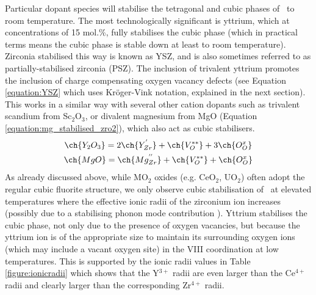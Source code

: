 Particular dopant species will stabilise the tetragonal and cubic phases of \zirconia\ to room temperature. The most technologically significant is yttrium, which at concentrations of 15 mol.\%, fully stabilises the cubic phase (which in practical terms means the cubic phase is stable down at least to room temperature). Zirconia stabilised this way is known as YSZ, and is also sometimes referred to as partially-stabilised zirconia (PSZ). The inclusion of trivalent yttrium promotes the inclusion of charge compensating oxygen vacancy defects (see Equation \ref{equation:YSZ} which uses Kr\"{o}ger-Vink notation, explained in the next section). This works in a similar way with several other cation dopants such as trivalent scandium from Sc$_{2}$O$_{3}$, or divalent magnesium from MgO (Equation \ref{equation:mg_stabilised_zro2}), which also act as cubic stabilisers.
\begin{gather}
\ch{Y_{2}O_{3}} = 2\ch{Y_{Zr}^{'}} + \ch{V_{O}^{**}} + 3\ch{O_{O}^{x}} \label{equation:YSZ} \\
\ch{MgO} = \ch{Mg_{Zr}^{''}} + \ch{V_{O}^{**}} + \ch{O_{O}^{x}} 
\label{equation:mg_stabilised_zro2}
\end{gather}
As already discussed above, while MO$_{2}$ oxides (e.g. CeO$_{2}$, UO$_{2}$) often adopt the regular cubic fluorite structure, we only observe cubic stabilisation  of \zirconia\ at elevated temperatures where the effective ionic radii of the zirconium ion increases (possibly due to a stabilising phonon mode contribution \cite{Mirgorodsky1999, Perry1990, Simeone2003, Harlow2018}). Yttrium stabilises the cubic phase, not only due to the presence of oxygen vacancies, but because the yttrium ion is of the appropriate size to maintain its surrounding oxygen ions (which may include a vacant oxygen site) in the VIII coordination at low temperatures. This is supported by the ionic radii values in Table \ref{figure:ionicradii} which shows that the Y$^{3+}$ radii are even larger than the Ce$^{4+}$ radii and clearly larger than the corresponding Zr$^{4+}$ radii. 


